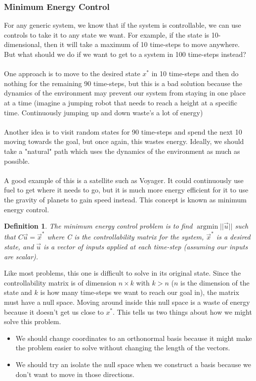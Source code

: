 \documentclass{article}
\newtheorem{definition}{Definition}
\DeclareMathOperator*{\argmin}{argmin}
\begin{document}
\subsubsection{Minimum Energy Control}
For any generic system, we know that if the system is controllable, we can use controls to take it to any state we want.
For example, if the state is 10-dimensional, then it will take a maximum of 10 time-steps to move anywhere.
But what should we do if we want to get to a system in 100 time-steps instead?
\\\\One approach is to move to the desired state $x^*$ in 10 time-steps and then do nothing for the remaining 90 time-steps,
 but this is a bad solution because the dynamics of the environment may prevent our system from staying in one place at a time (imagine a jumping robot that needs to reach a height at a specific time. Continuously jumping up and down waste's a lot of energy)
\\\\Another idea is to visit random states for 90 time-steps and spend the next 10 moving towards the goal, but once again, this wastes energy.
Ideally, we should take a "natural" path which uses the dynamics of the environment as much as possible.
\\\\A good example of this is a satellite such as Voyager. It could continuously use fuel to get where it needs to go, but it is much more energy efficient for it to use the gravity of planets to gain speed instead.
This concept is known as minimum energy control.
\begin{definition}
    The minimum energy control problem is to find $\argmin{||\vec{u}||}$ such that $C\vec{u}=\vec{x}^*$ where 
    C is the controllability matrix for the system, $\vec{x}^*$ is a desired state, and $\vec{u}$ is a vector of inputs applied at each time-step (assuming our inputs are scalar).
\end{definition}
Like most problems, this one is difficult to solve in its original state. Since the controllability matrix is of dimension $n \times k$ with $k > n$ ($n$ is the dimension of the state and $k$ is how many time-steps we want to reach our goal in), 
the matrix must have a null space. Moving around inside this null space is a waste of energy because it doesn't get us close to $x^*$. This tells us two things about how we might solve this problem.
\begin{itemize}
    \item[1. ] We should change coordinates to an orthonormal basis because it might make the problem easier to solve without changing the length of the vectors.
    \item[2. ] We should try an isolate the null space when we construct a basis because we don't want to move in those directions.  
\end{itemize}
\end{document}
